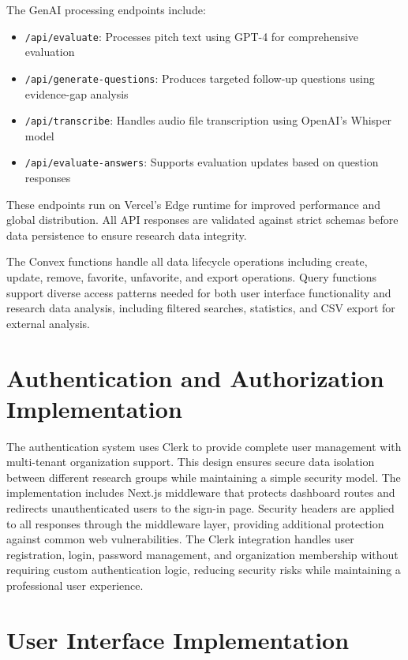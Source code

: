 The GenAI processing endpoints include:
\begin{itemize}
  \item \texttt{/api/evaluate}: Processes pitch text using GPT-4 for comprehensive evaluation
  \item \texttt{/api/generate-questions}: Produces targeted follow-up questions using evidence-gap analysis
  \item \texttt{/api/transcribe}: Handles audio file transcription using OpenAI's Whisper model
  \item \texttt{/api/evaluate-answers}: Supports evaluation updates based on question responses
\end{itemize}

These endpoints run on Vercel's Edge runtime for improved performance and global distribution. All API responses are validated against strict schemas before data persistence to ensure research data integrity.

The Convex functions handle all data lifecycle operations including create, update, remove, favorite, unfavorite, and export operations. Query functions support diverse access patterns needed for both user interface functionality and research data analysis, including filtered searches, statistics, and CSV export for external analysis.

\section{Authentication and Authorization Implementation}

The authentication system uses Clerk to provide complete user management with multi-tenant organization support. This design ensures secure data isolation between different research groups while maintaining a simple security model. The implementation includes Next.js middleware that protects dashboard routes and redirects unauthenticated users to the sign-in page. Security headers are applied to all responses through the middleware layer, providing additional protection against common web vulnerabilities. The Clerk integration handles user registration, login, password management, and organization membership without requiring custom authentication logic, reducing security risks while maintaining a professional user experience.


\section{User Interface Implementation}

